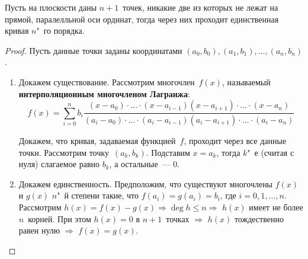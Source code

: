 \begin{theorem}
Пусть на плоскости даны $n + 1$~точек, никакие две из которых не лежат на прямой, паралелльной оси ординат, тогда через них проходит единственная кривая $n$"~го порядка.
\end{theorem}
\begin{proof}
Пусть данные точки заданы координатами $(a_0, b_0), (a_1, b_1), \ldots, (a_n, b_n)$.
\begin{enumerate}
	\item Докажем существование.
	Рассмотрим многочлен~$f(x)$, называемый \textbf{интерполяционным многочленом Лагранжа}:
	\begin{equation*}
	f(x) = \sum_{i=0}^n b_i \frac
	{(x - a_0) \cdot \ldots \cdot (x - a_{i-1})(x - a_{i+1}) \cdot \ldots \cdot (x - a_n)}
	{(a_i - a_0) \cdot \ldots \cdot (a_i - a_{i-1})(a_i - a_{i+1}) \cdot \ldots \cdot (a_i - a_n)}
	\end{equation*}
	
	Докажем, что кривая, задаваемая функцией~$f$, проходит через все данные точки.
	Рассмотрим точку~$(a_k, b_k)$.
	Подставим $x = a_k$, тогда $k$"~е (считая с нуля) слагаемое равно $b_k$, а остальные~--- 0.
	
	\item Докажем единственность.
	Предположим, что существуют многочлены $f(x)$ и $g(x)$ $n$"~й степени такие, что $f(a_i) = g(a_i) = b_i$, где $i = 0, 1, \ldots, n$.
	Рассмотрим $h(x) = f(x) - g(x) \Rightarrow \deg h \leqslant n \Rightarrow$ $h(x)$ имеет не более $n$~корней.
	При этом $h(x) = 0$ в $n + 1$~точках $\Rightarrow$ $h(x)$ тождественно равен нулю $\Rightarrow$ $f(x) = g(x)$.
\end{enumerate}
\end{proof}